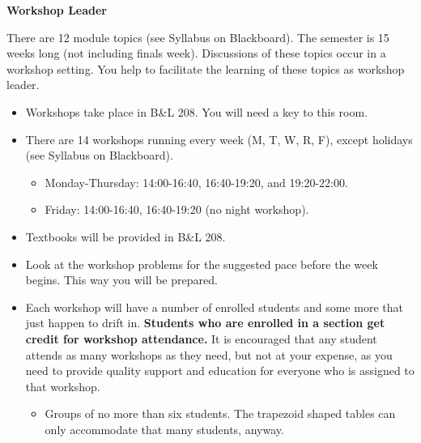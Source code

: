 \documentclass[11pt]{article}
\begin{document}
\hspace{1pt}

\begin{center}
\textbf{\Large Workshop Leader}
\end{center}

There are 12 module topics (see Syllabus on Blackboard). The semester is 15 weeks long (not including finals week). Discussions of these topics occur in a workshop setting. You help to facilitate the learning of these topics as workshop leader.

\begin{itemize}
	\item Workshops take place in B\&L 208. You will need a key to this room.
	\item There are 14 workshops running every week (M, T, W, R, F), except holidays (see Syllabus on Blackboard).
	\begin{itemize}
		\item Monday-Thursday: 14:00-16:40, 16:40-19:20, and 19:20-22:00.
		\item Friday: 14:00-16:40, 16:40-19:20 (no night workshop).
	\end{itemize}
	\item Textbooks will be provided in B\&L 208.
	\item Look at the workshop problems for the suggested pace before the week begins. This way you will be prepared.
	\item Each workshop will have a number of enrolled students and some more that just happen to drift in.  \textbf{Students who are enrolled in a section get credit for workshop attendance.} It is encouraged that any student attends as many workshops as they need, but not at your expense, as you need to provide quality support and education for everyone who is assigned to that workshop.
	\begin{itemize}
		\item Groups of no more than six students. The trapezoid shaped tables can only accommodate that many students, anyway.


\end{itemize}
\end{itemize}
\end{document}
